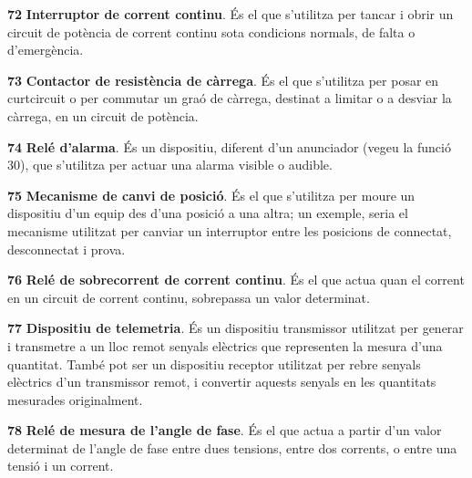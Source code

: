\begin{multicols}{2}
\begin{list}{}
\item[\textbf{72}]   
\textbf{Interruptor de corrent
continu}. \'{E}s el que s'utilitza per tancar i obrir un circuit de pot\`{e}ncia de corrent continu
 sota condicions normals, de falta o d'emerg\`{e}ncia.

\item[\textbf{73}]   
\textbf{Contactor de resist\`{e}ncia
 de c\`{a}rrega}. \'{E}s el que s'utilitza per posar en curtcircuit o per commutar un gra\'{o} de c\`{a}rrega,
 destinat a limitar o a desviar la c\`{a}rrega, en un circuit de pot\`{e}ncia.

\item[\textbf{74}]  
 \textbf{Rel\'{e} d'alarma}. \'{E}s un dispositiu,
diferent d'un anunciador (vegeu la funci\'{o} 30), que s'utilitza per actuar una alarma
visible o audible.

\item[\textbf{75}]  
 \textbf{Mecanisme de canvi
de posici\'{o}}. \'{E}s el que s'utilitza per moure un dispositiu d'un equip
des d'una posici\'{o} a una altra; un  exemple, seria el mecanisme
utilitzat per canviar un interruptor entre les posicions de
connectat, desconnectat i prova.

\item[\textbf{76}]   
\textbf{Rel\'{e} de
sobrecorrent de corrent continu}. \'{E}s el que actua quan el corrent en un circuit de
corrent continu, sobrepassa un valor determinat.

\item[\textbf{77}]   
\textbf{Dispositiu de telemetria}. \'{E}s un
 dispositiu transmissor utilitzat per generar i transmetre  a un lloc remot senyals el\`{e}ctrics que representen la mesura d'una quantitat. Tamb\'{e} pot ser un dispositiu receptor utilitzat per rebre senyals el\`{e}ctrics d'un transmissor remot, i convertir aquests senyals en les quantitats mesurades originalment.

\item[\textbf{78}]   
\textbf{Rel\'{e} de  mesura de l'angle de fase}. \'{E}s el que actua a partir d'un valor determinat de
l'angle de fase entre dues tensions, entre dos corrents, o entre una
tensi\'{o} i un corrent.


\end{list}
\end{multicols}
